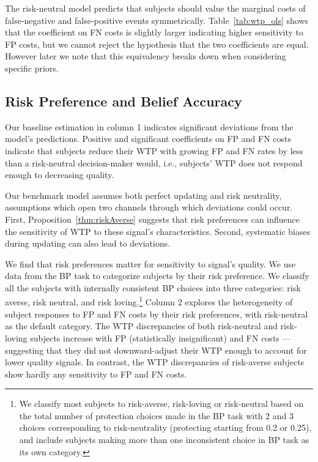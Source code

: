 \documentclass[12pt,a4paper]{article}
\begin{document}


The risk-neutral model predicts that subjects should value the marginal costs of false-negative and false-positive events symmetrically. Table~\ref{tab:wtp_ols} shows that the coefficient on FN costs is slightly larger indicating higher sensitivity to FP costs, but we cannot reject the hypothesis that the two coefficients are equal. However later we note that this equivalency breaks down when considering specific priors.

\subsection{Risk Preference and Belief Accuracy}

Our baseline estimation in column 1 indicates significant deviations from the model's predictions. Positive and significant coefficients on FP and FN costs indicate that subjects reduce their WTP with growing FP and FN rates by less than a risk-neutral decision-maker would, i.e., subjects' WTP does not respond enough to decreasing quality.

Our benchmark model assumes both perfect updating and risk neutrality, assumptions which open two channels through which deviations could occur. First, Proposition~\ref{thm:riskAverse} suggests that risk preferences can influence the sensitivity of WTP to these signal's characteristics. Second, systematic biases during updating can also lead to deviations. 

We find that risk preferences matter for sensitivity to signal's quality. We use data from the BP task to categorize subjects by their risk preference. We classify all the subjects with internally consistent BP choices into three categories: risk averse, risk neutral, and risk loving.\footnote{We classify most subjects to risk-averse, risk-loving or risk-neutral based on the total number of protection choices made in the BP task with 2 and 3 choices corresponding to risk-neutrality (protecting starting from 0.2 or 0.25), and include subjects making more than one inconsistent choice in BP task as its own category.} Column 2 explores the heterogeneity of subject responses to FP and FN costs by their risk preferences, with risk-neutral as the default category. 
The WTP discrepancies of both risk-neutral and risk-loving subjects increase with FP (statistically insignificant) and FN costs --- suggesting that they did not downward-adjust their WTP enough to account for lower quality signals. In contrast, the WTP discrepancies of risk-averse subjects show hardly any sensitivity to FP and FN costs.  
\end{document}
